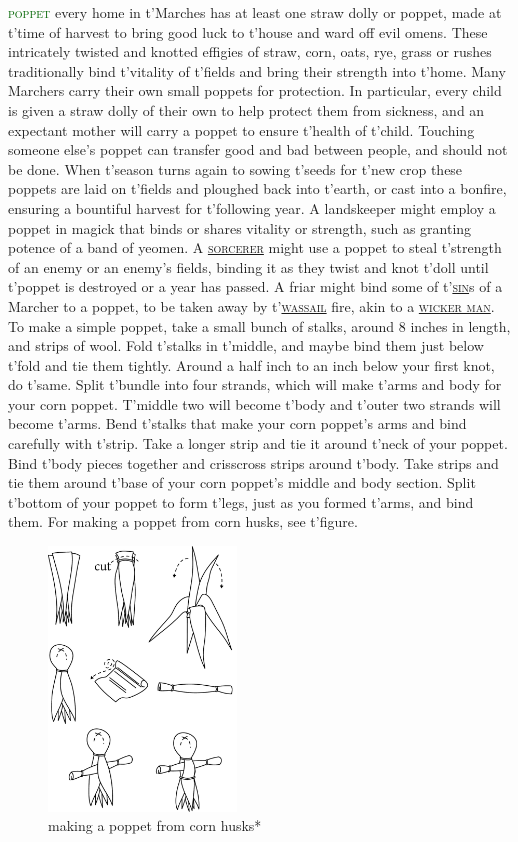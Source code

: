 \documentclass[twoside,11pt,b5paper,twocolumn]{scrbook}
\newcommand{\estcab}[1]{\textsc{\textcolor{marron}{#1}}}
\newcommand{\keyword}[1]{\textcolor{darkgreen}{#1}}
\renewcommand{\paragraph}[1]{\par\noindent\markboth{#1}{#1}\estcab{\keyword{#1}}\label{#1} }
\newcommand{\see}[1]{{\estcab{\hyperref[#1]{#1}}}}
\begin{document}
\paragraph{poppet} every home in t'Marches has at least one straw dolly or poppet, made at t'time of harvest to bring good luck to t'house and ward off evil omens. These intricately twisted and knotted effigies of straw, corn, oats, rye, grass or rushes traditionally bind t'vitality of t'fields and bring their strength into t'home. Many Marchers carry their own small poppets for protection. In particular, every child is given a straw dolly of their own to help protect them from sickness, and an expectant mother will carry a poppet to ensure t'health of t'child. Touching someone else’s poppet can transfer good and bad between people, and should not be done. When t'season turns again to sowing t'seeds for t'new crop these poppets are laid on t'fields and ploughed back into t'earth, or cast into a bonfire, ensuring a bountiful harvest for t'following year. A landskeeper might employ a poppet in magick that binds or shares vitality or strength, such as granting potence of a band of yeomen. A \see{sorcerer} might use a poppet to steal t'strength of an enemy or an enemy's fields, binding it as they twist and knot t'doll until t'poppet is destroyed or a year has passed. A friar might bind some of t'\see{sin}s of a Marcher to a poppet, to be taken away by t'\see{wassail} fire, akin to a \see{wicker man}. To make a simple poppet, take a small bunch of stalks, around 8 inches in length, and strips of wool. Fold t'stalks in t'middle, and maybe bind them just below t'fold and tie them tightly. Around a half inch to an inch below your first knot, do t'same. Split t'bundle into four strands, which will make t'arms and body for your corn poppet. T'middle two will become t'body and t'outer two strands will become t'arms. Bend t'stalks that make your corn poppet’s arms and bind carefully with t'strip. Take a longer strip and tie it around t'neck of your poppet. Bind t'body pieces together and crisscross strips around t'body. Take strips and tie them around t'base of your corn poppet’s middle and body section. Split t'bottom of your poppet to form t'legs, just as you formed t'arms, and bind them. For making a poppet from corn husks, see t'figure.\begin{figure}\centering\includegraphics[width=5cm]{encyclopedia/poppet}\caption{making a poppet from corn husks*}\end{figure}
\end{document}
